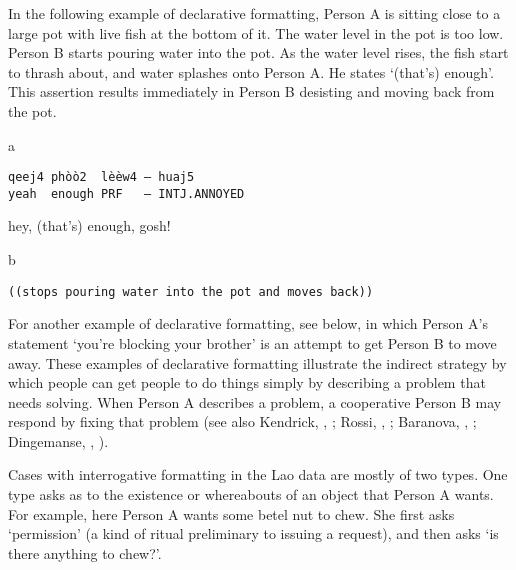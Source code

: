 \documentclass[output=paper]{langsci/langscibook}
\begin{document}
In the following example of declarative formatting, Person A is sitting close to a large pot with live fish at the bottom of it. The water level in the pot is too low. Person B starts pouring water into the pot. As the water level rises, the fish start to thrash about, and water splashes onto Person A. He states ‘(that’s) enough’. This assertion results immediately in Person B desisting and moving back from the pot.

\vspace{-1mm}
%
\begin{mdframednoverticalspace}[style=firstfoc]
\begin{transbox}{1}{a}
\begin{verbatim}
qeej4 phòò2  lèèw4 – huaj5
yeah  enough PRF   – INTJ.ANNOYED
\end{verbatim}
hey, (that's) enough, gosh!
\end{transbox}
\end{mdframednoverticalspace}
%
\vspace{-1mm}
%
\begin{mdframednoverticalspace}[style=secondfoc]
\begin{transbox}{2}{b}
\begin{verbatim}
((stops pouring water into the pot and moves back))
\end{verbatim}
\end{transbox}
\end{mdframednoverticalspace}

For another example of declarative formatting, see  below, in which Person A’s statement ‘you’re blocking your brother’ is an attempt to get Person B to move away. These examples of declarative formatting illustrate the indirect strategy by which people can get people to do things simply by describing a problem that needs solving. When Person A describes a problem, a cooperative Person B may respond by fixing that problem (see also Kendrick, , ; Rossi, , ; Baranova, , ; Dingemanse, , ). %

Cases with interrogative formatting in the Lao data are mostly of two types. One type asks as to the existence or whereabouts of an object that Person A wants. For example, here Person A wants some betel nut to chew. She first asks ‘permission’ (a kind of ritual preliminary to issuing a request), and then asks ‘is there anything to chew?’.
\end{document}
